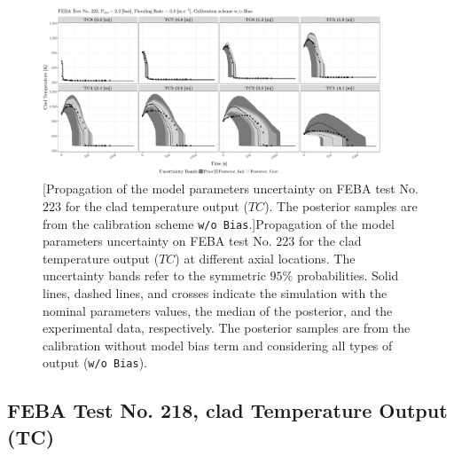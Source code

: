 \clearpage
\begin{figure}
	\centering
	\includegraphics[width=0.90\textwidth]{../figures/chapter5/figures/plotTraceUQPosteriorAllNoDiscNoBCTC223}
		[Propagation of the model parameters uncertainty on FEBA test No. $223$ for the clad temperature output ($TC$). The posterior samples are from the calibration scheme \texttt{w/o Bias}.]{Propagation of the model parameters uncertainty on FEBA test No. $223$ for the clad temperature output ($TC$) at different axial locations. The uncertainty bands refer to the symmetric $95\%$ probabilities. Solid lines, dashed lines, and crosses indicate the simulation with the nominal parameters values, the median of the posterior, and the experimental data, respectively. The posterior samples are from the calibration without model bias term and considering all types of output (\texttt{w/o Bias}).}
	\label{fig:ch5_plot_trace_uq_post_tc_223_nodisc}
\end{figure}
\clearpage

\subsection{FEBA Test No. 218, clad Temperature Output (TC)}\label{app:tbl_results_uq_post_tc_218}

